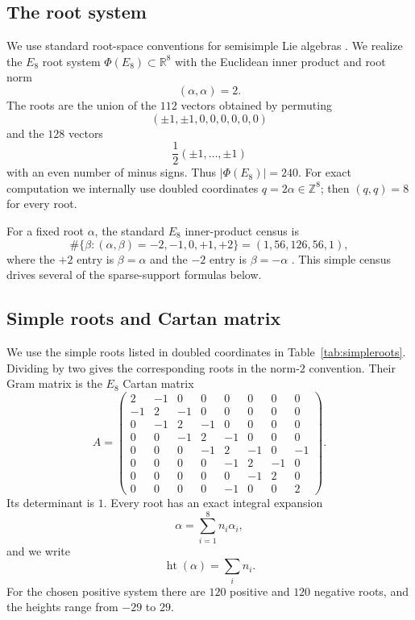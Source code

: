 \documentclass[11pt]{article}
\theoremstyle{definition}
\theoremstyle{remark}
\newcommand{\PhiE}{\Phi(E_8)}
\begin{document}
\subsection{The root system}

We use standard root-space conventions for semisimple Lie algebras \cite{Humphreys1972}.  We realize the $E_8$ root system $\PhiE\subset\mathbb R^8$ with the Euclidean inner product and root norm
\[
(\alpha,\alpha)=2.
\]
The roots are the union of the $112$ vectors obtained by permuting
\[
(\pm1,\pm1,0,0,0,0,0,0)
\]
and the $128$ vectors
\[
\frac12(\pm1,\ldots,\pm1)
\]
with an even number of minus signs.  Thus $|\PhiE|=240$.  For exact computation we internally use doubled coordinates $q=2\alpha\in\mathbb Z^8$; then $(q,q)=8$ for every root.

For a fixed root $\alpha$, the standard $E_8$ inner-product census is
\begin{equation}\label{eq:innercensus}
\#\{\beta:(\alpha,\beta)=-2,-1,0,+1,+2\}
=
(1,56,126,56,1),
\end{equation}
where the $+2$ entry is $\beta=\alpha$ and the $-2$ entry is $\beta=-\alpha$ \cite{WinterVanLuijk2021}.  This simple census drives several of the sparse-support formulas below.

\subsection{Simple roots and Cartan matrix}

We use the simple roots listed in doubled coordinates in Table~\ref{tab:simpleroots}.  Dividing by two gives the corresponding roots in the norm-$2$ convention.  Their Gram matrix is the $E_8$ Cartan matrix
\begin{equation}\label{eq:cartanmatrix}
A=
\begin{pmatrix}
2&-1&0&0&0&0&0&0\\
-1&2&-1&0&0&0&0&0\\
0&-1&2&-1&0&0&0&0\\
0&0&-1&2&-1&0&0&0\\
0&0&0&-1&2&-1&0&-1\\
0&0&0&0&-1&2&-1&0\\
0&0&0&0&0&-1&2&0\\
0&0&0&0&-1&0&0&2
\end{pmatrix}.
\end{equation}
Its determinant is $1$.  Every root has an exact integral expansion
\[
\alpha=\sum_{i=1}^8 n_i\alpha_i,
\]
and we write
\[
\operatorname{ht}(\alpha)=\sum_i n_i.
\]
For the chosen positive system there are $120$ positive and $120$ negative roots, and the heights range from $-29$ to $29$.
\end{document}
